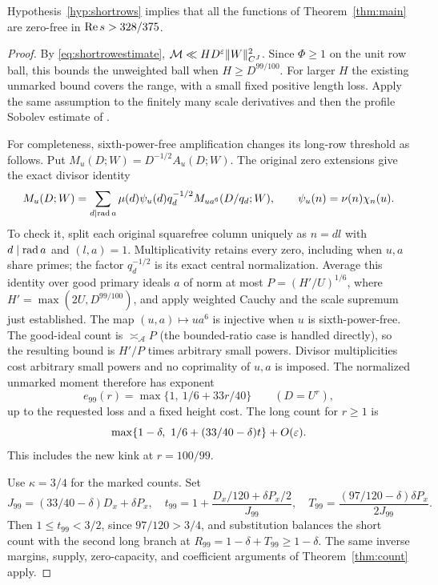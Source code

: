 \begin{proposition}\label{prop:conditional}
Hypothesis~\ref{hyp:shortrows} implies that all the functions of Theorem~\ref{thm:main} are zero-free in $\operatorname{Re} s>328/375$.
\end{proposition}
\begin{proof}
By \eqref{eq:shortrowestimate}, $\mathcal M\ll HD^\varepsilon\|W\|_{C^J}^2$. Since $\Phi\ge1$ on the unit row ball, this bounds the unweighted ball when $H\ge D^{99/100}$. For larger $H$ the existing unmarked bound  covers the range, with a small fixed positive length loss. Apply the same assumption to the finitely many scale derivatives and then the profile Sobolev estimate of .

For completeness, sixth-power-free amplification changes its long-row threshold as follows. Put $M_u(D;W)=D^{-1/2}A_u(D;W)$. The original zero extensions give the exact divisor identity
\[
 M_u(D;W)=\sum_{d\mid\operatorname{rad} a}\mu(d)\psi_u(d)q_d^{-1/2}
                       M_{ua^6}(D/q_d;W),\qquad \psi_u(n)=\nu(n)\chi_n(u).
\]
To check it, split each original squarefree column uniquely as $n=dl$ with $d\mid\operatorname{rad} a$ and $(l,a)=1$. Multiplicativity retains every zero, including when $u,a$ share primes; the factor $q_d^{-1/2}$ is its exact central normalization. Average this identity over good primary ideals $a$ of norm at most $P=(H'/U)^{1/6}$, where $H'=\max(2U,D^{99/100})$, and apply weighted Cauchy and the scale supremum just established. The map $(u,a)\mapsto ua^6$ is injective when $u$ is sixth-power-free. The good-ideal count is $\asymp_{\mathcal A}P$ (the bounded-ratio case is handled directly), so the resulting bound is $H'/P$ times arbitrary small powers. Divisor multiplicities cost arbitrary small powers and no coprimality of $u,a$ is imposed. The normalized unmarked moment therefore has exponent
\[
 e_{99}(r)=\max\{1,\ 1/6+33r/40\}\qquad(D=U^r),
\]
up to the requested loss and a fixed height cost. The long count for $r\ge1$ is
\[
 \max\{1-\delta,\ 1/6+(33/40-\delta)t\}+O(\eps).
\]
This includes the new kink at $r=100/99$.

Use $\kappa=3/4$ for the marked counts. Set
\[
 J_{99}=(33/40-\delta)D_x+\delta P_x,\quad
 t_{99}=1+\frac{D_x/120+\delta P_x/2}{J_{99}},\quad
 T_{99}=\frac{(97/120-\delta)\delta P_x}{2J_{99}}.
\]
Then $1\le t_{99}<3/2$, since $97/120>3/4$, and substitution balances the short count with the second long branch at $R_{99}=1-\delta+T_{99}\ge1-\delta$. The same inverse margins, supply, zero-capacity, and coefficient arguments of Theorem~\ref{thm:count} apply.


\end{proof}
